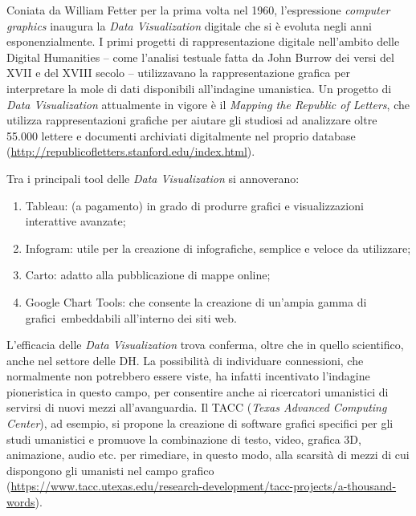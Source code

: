 \documentclass[
  b5paper,
  twoside,
  11pt,
  chapterprefix=false,
  bibliography=totocnumbered,
  parskip=0]{scrbook}
\begin{document}
Coniata da William Fetter per la prima volta nel 1960, l'espressione
\emph{computer} \emph{graphics} inaugura la \emph{Data Visualization} digitale che si è
evoluta negli anni esponenzialmente. I primi progetti di
rappresentazione digitale nell'ambito delle Digital Humanities -- come
l'analisi testuale fatta da John Burrow dei versi del XVII e del XVIII
secolo -- utilizzavano la rappresentazione grafica per interpretare la
mole di dati disponibili all'indagine umanistica. Un progetto di \emph{Data
Visualization} attualmente in vigore è il \emph{Mapping the Republic of
Letters}, che utilizza rappresentazioni grafiche per aiutare gli
studiosi ad analizzare oltre 55.000 lettere e documenti archiviati
digitalmente nel proprio database
(\href{http://republicofletters.stanford.edu/index.html}{{http://republicofletters.stanford.edu/index.html}}).

Tra i principali tool delle \emph{Data Visualization} si annoverano:

\begin{enumerate}
\def\labelenumi{\arabic{enumi}.}
\item
  Tableau: (a pagamento) in grado di produrre grafici e
  visualizzazioni interattive avanzate;
\item
  Infogram: utile per la creazione di infografiche, semplice e veloce
  da utilizzare;
\item
  Carto: adatto alla pubblicazione di mappe online;
\item
  Google Chart Tools: che consente la creazione di un'ampia gamma di
  grafici~embeddabili all'interno dei siti web.
\end{enumerate}

L'efficacia delle \emph{Data Visualization} trova conferma, oltre che in
quello scientifico, anche nel settore delle DH. La possibilità di
individuare connessioni, che normalmente non potrebbero essere viste, ha
infatti incentivato l'indagine pioneristica in questo campo, per
consentire anche ai ricercatori umanistici di servirsi di nuovi mezzi
all'avanguardia. Il TACC (\emph{Texas Advanced Computing Center}), ad
esempio, si propone la creazione di software grafici specifici per gli
studi umanistici e promuove la combinazione di testo, video, grafica 3D,
animazione, audio etc. per rimediare, in questo modo, alla scarsità di
mezzi di cui dispongono gli umanisti nel campo grafico
(\href{https://www.tacc.utexas.edu/research-development/tacc-projects/a-thousand-words}{{https://www.tacc.utexas.edu/research-development/tacc-projects/a-thousand-words}}).
\end{document}
